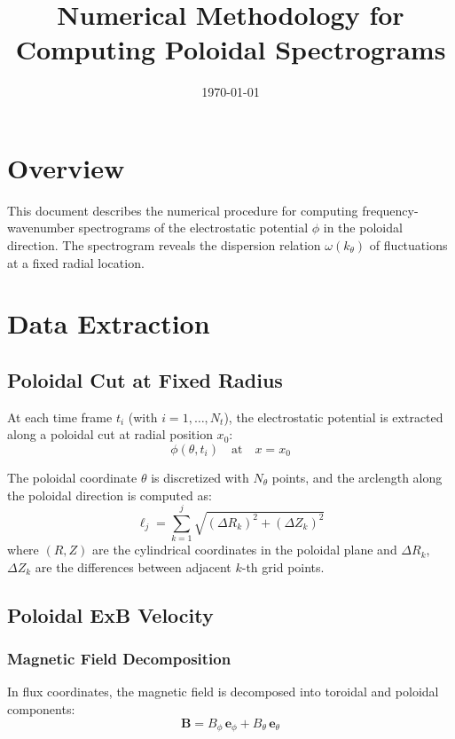 \documentclass[11pt,a4paper]{article}
\title{Numerical Methodology for Computing Poloidal Spectrograms}
\author{}
\date{\today}
\begin{document}
\maketitle

\section{Overview}

This document describes the numerical procedure for computing frequency-wavenumber spectrograms of the electrostatic potential $\phi$ in the poloidal direction. The spectrogram reveals the dispersion relation $\omega(k_\theta)$ of fluctuations at a fixed radial location.

\section{Data Extraction}

\subsection{Poloidal Cut at Fixed Radius}

At each time frame $t_i$ (with $i = 1, \ldots, N_t$), the electrostatic potential is extracted along a poloidal cut at radial position $x_0$:
\begin{equation}
\phi(\theta, t_i) \quad \text{at} \quad x = x_0
\end{equation}

The poloidal coordinate $\theta$ is discretized with $N_\theta$ points, and the arclength along the poloidal direction is computed as:
\begin{equation}
\ell_j = \sum_{k=1}^{j} \sqrt{(\Delta R_k)^2 + (\Delta Z_k)^2}
\end{equation}
where $(R, Z)$ are the cylindrical coordinates in the poloidal plane and $\Delta R_k$, $\Delta Z_k$ are the differences between adjacent $k$-th grid points.

\subsection{Poloidal ExB Velocity}

\subsubsection{Magnetic Field Decomposition}

In flux coordinates, the magnetic field is decomposed into toroidal and poloidal components:
\begin{equation}
\mathbf{B} = B_\phi \, \mathbf{e}_\phi + B_\theta \, \mathbf{e}_\theta
\end{equation}
\end{document}
